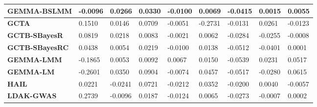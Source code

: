 \documentclass[pdflatex,sn-basic]{sn-jnl}
\begin{document}
\begin{table}[!ht]
{\begin{tabular}{|l|l|l|l|l|l|l|l|l|}
\hline
\textbf{GEMMA-BSLMM} & \cellcolor[HTML]{FDC97D}-0.0096 & \cellcolor[HTML]{FEE182}0.0266 & \cellcolor[HTML]{F8E984}0.0330 & \cellcolor[HTML]{FEDA80}-0.0100 & \cellcolor[HTML]{FEEB84}0.0069 & \cellcolor[HTML]{FCC57C}-0.0415 & \cellcolor[HTML]{FEDD81}0.0015 & \cellcolor[HTML]{F2E884}0.0055 \\
\hline
\textbf{GCTA} & \cellcolor[HTML]{C6DB81}0.1510 & \cellcolor[HTML]{FDC67D}0.0146 & \cellcolor[HTML]{B0D580}0.0709 & \cellcolor[HTML]{FEEB84}-0.0051 & \cellcolor[HTML]{F8696B}-0.2731 & \cellcolor[HTML]{E3E383}-0.0131 & \cellcolor[HTML]{DDE283}0.0261 & \cellcolor[HTML]{FA9874}-0.0123 \\
\hline
\textbf{GCTB-SBayesR} & \cellcolor[HTML]{FDEB84}0.0819 & \cellcolor[HTML]{FDD680}0.0218 & \cellcolor[HTML]{FCC37C}0.0083 & \cellcolor[HTML]{F3E884}-0.0021 & \cellcolor[HTML]{FFEB84}0.0062 & \cellcolor[HTML]{FEE282}-0.0284 & \cellcolor[HTML]{FBA476}-0.0255 & \cellcolor[HTML]{FEE482}-0.0008 \\
\hline
\textbf{GCTB-SBayesRC} & \cellcolor[HTML]{FEDD81}0.0438 & \cellcolor[HTML]{FBB179}0.0054 & \cellcolor[HTML]{FEDD81}0.0219 & \cellcolor[HTML]{FEDA80}-0.0100 & \cellcolor[HTML]{EEE784}0.0138 & \cellcolor[HTML]{FBB078}-0.0512 & \cellcolor[HTML]{F98570}-0.0401 & \cellcolor[HTML]{FEEA83}0.0001 \\
\hline
\textbf{GEMMA-LMM} & \cellcolor[HTML]{F98570}-0.1865 & \cellcolor[HTML]{FBB178}0.0053 & \cellcolor[HTML]{FCC57C}0.0092 & \cellcolor[HTML]{D4DF82}0.0067 & \cellcolor[HTML]{ECE683}0.0150 & \cellcolor[HTML]{FBAA77}-0.0539 & \cellcolor[HTML]{E3E383}0.0231 & \cellcolor[HTML]{7CC67D}0.0517 \\
\hline
\textbf{GEMMA-LM} & \cellcolor[HTML]{F8696B}-0.2601 & \cellcolor[HTML]{E9E583}0.0350 & \cellcolor[HTML]{8BCA7E}0.0904 & \cellcolor[HTML]{FEE482}-0.0074 & \cellcolor[HTML]{A8D27F}0.0457 & \cellcolor[HTML]{FBAF78}-0.0517 & \cellcolor[HTML]{FA9F75}-0.0280 & \cellcolor[HTML]{63BE7B}0.0615 \\
\hline
\textbf{HAIL} & \cellcolor[HTML]{FDD57F}0.0221 & \cellcolor[HTML]{F86F6C}-0.0241 & \cellcolor[HTML]{AED480}0.0721 & \cellcolor[HTML]{FBB178}-0.0212 & \cellcolor[HTML]{BFD981}0.0352 & \cellcolor[HTML]{F4E884}-0.0200 & \cellcolor[HTML]{FEE282}0.0040 & \cellcolor[HTML]{FCC47C}-0.0057 \\
\hline
\textbf{LDAK-GWAS} & \cellcolor[HTML]{63BE7B}0.2739 & \cellcolor[HTML]{FA8F72}-0.0096 & \cellcolor[HTML]{FDD780}0.0187 & \cellcolor[HTML]{FDD17F}-0.0124 & \cellcolor[HTML]{FEEB84}0.0065 & \cellcolor[HTML]{FEE482}-0.0273 & \cellcolor[HTML]{FED880}-0.0007 & \cellcolor[HTML]{FFEB84}0.0002 \\

\end{tabular}}
\end{table}
\end{document}
